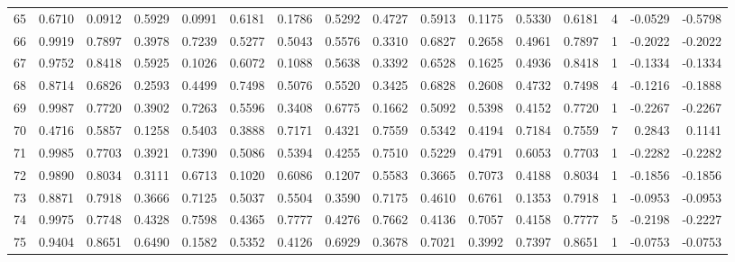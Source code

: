 \begin{tabular}{lrrrrrrrrrrrrrrr}
65  &      0.6710 &  0.0912 &  0.5929 &  0.0991 &  0.6181 &  0.1786 &  0.5292 &  0.4727 &  0.5913 &  0.1175 &   0.5330 &     0.6181 &      4 &                   -0.0529 &                    -0.5798 \\
66  &      0.9919 &  0.7897 &  0.3978 &  0.7239 &  0.5277 &  0.5043 &  0.5576 &  0.3310 &  0.6827 &  0.2658 &   0.4961 &     0.7897 &      1 &                   -0.2022 &                    -0.2022 \\
67  &      0.9752 &  0.8418 &  0.5925 &  0.1026 &  0.6072 &  0.1088 &  0.5638 &  0.3392 &  0.6528 &  0.1625 &   0.4936 &     0.8418 &      1 &                   -0.1334 &                    -0.1334 \\
68  &      0.8714 &  0.6826 &  0.2593 &  0.4499 &  0.7498 &  0.5076 &  0.5520 &  0.3425 &  0.6828 &  0.2608 &   0.4732 &     0.7498 &      4 &                   -0.1216 &                    -0.1888 \\
69  &      0.9987 &  0.7720 &  0.3902 &  0.7263 &  0.5596 &  0.3408 &  0.6775 &  0.1662 &  0.5092 &  0.5398 &   0.4152 &     0.7720 &      1 &                   -0.2267 &                    -0.2267 \\
70  &      0.4716 &  0.5857 &  0.1258 &  0.5403 &  0.3888 &  0.7171 &  0.4321 &  0.7559 &  0.5342 &  0.4194 &   0.7184 &     0.7559 &      7 &                    0.2843 &                     0.1141 \\
71  &      0.9985 &  0.7703 &  0.3921 &  0.7390 &  0.5086 &  0.5394 &  0.4255 &  0.7510 &  0.5229 &  0.4791 &   0.6053 &     0.7703 &      1 &                   -0.2282 &                    -0.2282 \\
72  &      0.9890 &  0.8034 &  0.3111 &  0.6713 &  0.1020 &  0.6086 &  0.1207 &  0.5583 &  0.3665 &  0.7073 &   0.4188 &     0.8034 &      1 &                   -0.1856 &                    -0.1856 \\
73  &      0.8871 &  0.7918 &  0.3666 &  0.7125 &  0.5037 &  0.5504 &  0.3590 &  0.7175 &  0.4610 &  0.6761 &   0.1353 &     0.7918 &      1 &                   -0.0953 &                    -0.0953 \\
74  &      0.9975 &  0.7748 &  0.4328 &  0.7598 &  0.4365 &  0.7777 &  0.4276 &  0.7662 &  0.4136 &  0.7057 &   0.4158 &     0.7777 &      5 &                   -0.2198 &                    -0.2227 \\
75  &      0.9404 &  0.8651 &  0.6490 &  0.1582 &  0.5352 &  0.4126 &  0.6929 &  0.3678 &  0.7021 &  0.3992 &   0.7397 &     0.8651 &      1 &                   -0.0753 &                    -0.0753 \\

\end{tabular}

